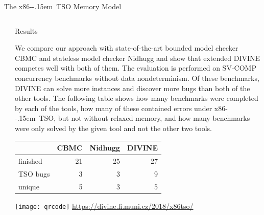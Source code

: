 \documentclass[final, 20pt, a0]{beamer}
\newlength{\marginwid}
\newlength{\onecolwid}
\newlength{\twocolwid}
\newcommand{\xtso}{\mbox{x86-\kern-.15em TSO}\xspace}
\newcommand{\divine}{\mbox{DIVINE}\xspace}
\begin{document}
\begin{frame}[t]
\begin{columns}[t]
\begin{column}{\twocolwid}
\begin{block}{The \xtso Memory Model}
\end{block}

\end{column} %

\begin{column}{\marginwid}\end{column} %

\end{columns}

\begin{columns}[t] %

\begin{column}{\marginwid}\end{column} %
\begin{column}{\onecolwid} %

\begin{block}{Results}

We compare our approach with state-of-the-art bounded model checker CBMC and stateless model checker Nidhugg and show that extended \divine competes well with both of them.
The evaluation is performed on SV-COMP concurrency benchmarks without data nondeterminism.
Of these benchmarks, \divine can solve more instances and discover more bugs than both of the other tools.
The following table shows how many benchmarks were completed by each of the tools, how many of these contained errors under \xtso, but not without relaxed memory, and how many benchmarks were only solved by the given tool and not the other two tools.

\begingroup
\vspace{3ex}
\centering
\setlength\tabcolsep{0.5em} %
\renewcommand{\arraystretch}{1.1} %
\begin{tabular}{lrrr} \toprule
             & CBMC & Nidhugg & DIVINE \\ \midrule
    finished &   21 &      25 &     27 \\
    TSO bugs &    3 &       3 &      9 \\
    unique   &    5 &       3 &      5 \\
    \bottomrule
\end{tabular}
\endgroup
\bigskip
\end{block}

\bigskip
\texttt{[image: qrcode]}
\rm\footnotesize\href{https://divine.fi.muni.cz/2018/x86tso/}{https://divine.fi.muni.cz/2018/x86tso/}


\end{column}
\end{columns}
\end{frame}
\end{document}
